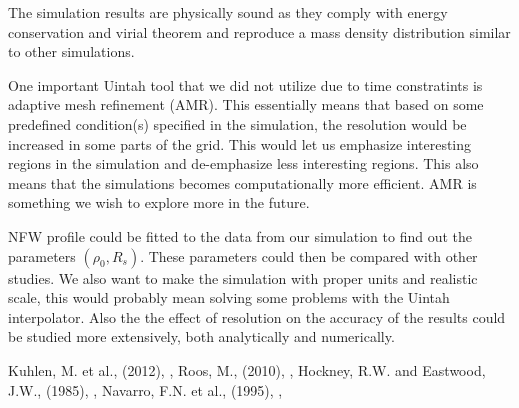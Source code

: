 \documentclass[notitlepage, 12pt]{article}
\begin{document}
The simulation results are physically sound as they comply with energy conservation and virial theorem and reproduce a mass density distribution similar to other simulations.

One important Uintah tool that we did not utilize due to time constratints is adaptive mesh refinement (AMR). This essentially means that based on some predefined condition(s) specified in the simulation, the resolution would be increased in some parts of the grid. This would let us emphasize interesting regions in the simulation and de-emphasize less interesting regions. This also means that the simulations becomes computationally more efficient. AMR is something we wish to explore more in the future.

NFW profile could be fitted to the data from our simulation to find out the parameters $(\rho_0,R_s)$. These parameters could then be compared with other studies. We also want to make the simulation with proper units and realistic scale, this would probably mean solving some problems with the Uintah interpolator. Also the the effect of resolution on the accuracy of the results could be studied more extensively, both analytically and numerically. 

        

        

\renewcommand{\refname}{REFERENCES}
\begin{thebibliography}{}
Kuhlen, M. et al., (2012),
,
Roos, M., (2010),
,
Hockney, R.W. and Eastwood, J.W., (1985),
,
Navarro, F.N. et al., (1995),
,
\end{thebibliography}
\end{document}
